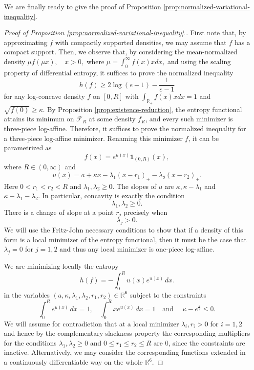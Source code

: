 \documentclass{article}
\theoremstyle{plain}
\theoremstyle{definition}
\newcommand{\dd}{\,d}
\newcommand{\1}{\mathbf 1}
\begin{document}
We are finally ready to give the proof of Proposition \ref{prop:normalized-variational-inequality}.
\begin{proof} [Proof of Proposition \ref{prop:normalized-variational-inequality}.]
    
First note that, by approximating $f$ with compactly supported densities, we may assume that $f$ has a compact support. Then, we observe that, by considering the mean-normalized density  
$ 
\mu f(\mu x), \quad x>0,
$
where $\mu = {\int_0^{\infty}f(x)xdx},$
and using the scaling property of differential entropy, it suffices to prove the normalized inequality
\[
h(f)\ge 2\log(e-1)-\frac1{e-1}
\]
for any log-concave density $f$ on $[0,R]$ with $\int_{\mathbb R_+}f(x)xdx = 1$ and $\sqrt{f(0)} \geq \kappa$. 
By Proposition \ref{prop:existence-reduction}, the entropy functional attains its minimum on
\(\mathcal F_R\) at some density \(f_R\), and every such minimizer is
three-piece log-affine. Therefore, it suffices to prove the normalized
inequality for a three-piece log-affine minimizer. Renaming this
minimizer \(f\), it can be parametrized as
\[
f(x)=e^{u(x)}\1_{(0,R)}(x),
\]
where \(R\in(0,\infty)\) and
\[
u(x)=a+\kappa x-\lambda_1(x-r_1)_+-\lambda_2(x-r_2)_+.
\]
Here
$
0<r_1<r_2<R$ and 
$\lambda_1,\lambda_2\ge0.
$
The slopes of \(u\) are $\kappa,
\kappa-\lambda_1$ and $\kappa-\lambda_1-\lambda_2.$
In particular, concavity is exactly the condition
\[
\lambda_1,\lambda_2\ge0.
\]
There is a change of slope at a point \(r_j\) precisely when
\[
\lambda_j>0.
\]
We will use the Fritz-John necessary conditions to show that if a density of this form is a local minimizer of the entropy functional, then it must be the case that $\lambda_j = 0$ for $j=1,2$ and thus any local minimizer is one-piece log-affine. 

We are minimizing locally the entropy 
\[
h(f)=-\int_0^R u(x)e^{u(x)}\dd x.
\]
in the variables $(a, \kappa, \lambda_1,\lambda_2,r_1, r_2) \in \mathbb R^6$ subject to the constraints
\[
\int_0^R e^{u(x)}\dd x=1,
\quad 
\int_0^R x e^{u(x)}\dd x=1 \quad \text{and } \quad \kappa-e^{\frac{a}{2}}\le0.
\]
We will assume for contradiction that at a local minimizer $\lambda_i, r_i >0$  for $i=1,2$ and hence by the complementary slackness property \cite[Proposition 3.3.5, (iv)]{bertsekas} the corresponding multipliers for the conditions $\lambda_1,\lambda_2 \geq 0$ and $0\leq r_1 \leq r_2 \leq R$ are $0$, since the constraints are inactive. Alternatively, we may consider the corresponding functions extended in a continuously differentiable way on the whole $\mathbb R^6$. 


\end{proof}
\end{document}
